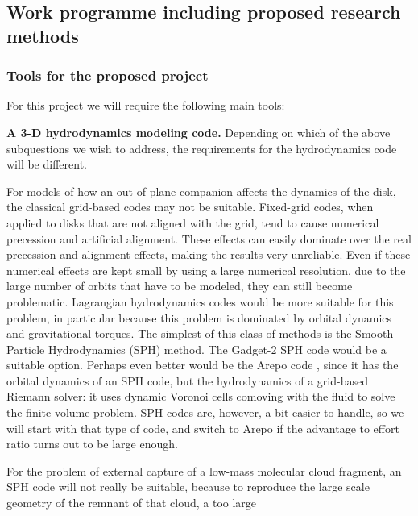 \documentclass[10pt,fleqn,twoside]{article}
\begin{document}
\subsection{Work programme including proposed research methods}

\subsubsection{Tools for the proposed project}
For this project we will require the following main tools:
\begin{compactenumerate}
\item {\bf A 3-D hydrodynamics modeling code.} Depending on which of the
  above subquestions we wish to address, the requirements for the
  hydrodynamics code will be different. 
  \begin{compactitemize}
  \item For models of how an out-of-plane companion affects the dynamics of
    the disk, the classical grid-based codes may not be suitable. Fixed-grid
    codes, when applied to disks that are not aligned with the grid, tend to
    cause numerical precession and artificial alignment. These effects can
    easily dominate over the real precession and alignment effects, making
    the results very unreliable. Even if these numerical effects are kept
    small by using a large numerical resolution, due to the large number of
    orbits that have to be modeled, they can still become problematic.
    Lagrangian hydrodynamics codes would be more suitable for this problem,
    in particular because this problem is dominated by orbital dynamics and
    gravitational torques. The simplest of this class of methods is the
    Smooth Particle Hydrodynamics (SPH) method. The Gadget-2 SPH code
    \citep{2005MNRAS.364.1105S} would be a suitable option. Perhaps even
    better would be the Arepo code \citep{2010MNRAS.401..791S}, since it has
    the orbital dynamics of an SPH code, but the hydrodynamics of a
    grid-based Riemann solver: it uses dynamic Voronoi cells comoving with
    the fluid to solve the finite volume problem. SPH codes are, however, a
    bit easier to handle, so we will start with that type of code, and
    switch to Arepo if the advantage to effort ratio turns out to be large
    enough.
  \item For the problem of external capture of a low-mass molecular cloud
    fragment, an SPH code will not really be suitable, because to reproduce
    the large scale geometry of the remnant of that cloud, a too large

\end{compactitemize}
\end{compactenumerate}
\end{document}
